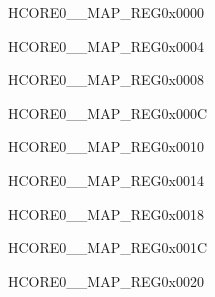 \begin{register}{H}{CORE0\_\_MAP\_REG}{0x0000}\label{regdesc:CORE0LPRTCINTMAPREG}
\end{register}\vspace{-3em}


\begin{register}{H}{CORE0\_\_MAP\_REG}{0x0004}\label{regdesc:CORE0LPWDTINTMAPREG}
\end{register}\vspace{-3em}


\begin{register}{H}{CORE0\_\_MAP\_REG}{0x0008}\label{regdesc:CORE0LPTIMERREG0INTMAPREG}
\end{register}\vspace{-3em}


\begin{register}{H}{CORE0\_\_MAP\_REG}{0x000C}\label{regdesc:CORE0LPTIMERREG1INTMAPREG}
\end{register}\vspace{-3em}


\begin{register}{H}{CORE0\_\_MAP\_REG}{0x0010}\label{regdesc:CORE0MBHPINTMAPREG}
\end{register}\vspace{-3em}


\begin{register}{H}{CORE0\_\_MAP\_REG}{0x0014}\label{regdesc:CORE0MBLPINTMAPREG}
\end{register}\vspace{-3em}


\begin{register}{H}{CORE0\_\_MAP\_REG}{0x0018}\label{regdesc:CORE0PMUREG0INTMAPREG}
\end{register}\vspace{-3em}


\begin{register}{H}{CORE0\_\_MAP\_REG}{0x001C}\label{regdesc:CORE0PMUREG1INTMAPREG}
\end{register}\vspace{-3em}


\begin{register}{H}{CORE0\_\_MAP\_REG}{0x0020}\label{regdesc:CORE0LPANAPERIINTMAPREG}
\end{register}\vspace{-3em}


